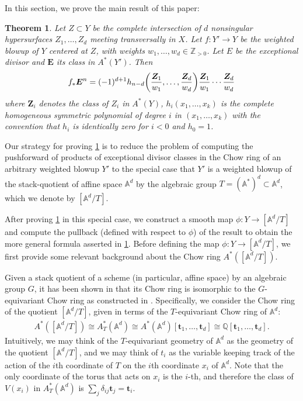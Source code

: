 \documentclass[11pt,oneside,english]{article}
\numberwithin{equation}{section}
\let\originalleft\left
\let\originalright\right
\renewcommand*{\left}{\mathopen{}\mathclose\bgroup\originalleft}
\renewcommand*{\right}{\aftergroup\egroup\originalright}
\newtheorem{theorem}{Theorem}[section]
\theoremstyle{definition}
\newcommand{\ra}{\rightarrow}
\newcommand\A{\mathbb{A}}
\begin{document}
In this section, we prove the main result of this paper:




\begin{theorem} \label{main}{Let $Z \subset Y$ be the complete intersection of $d$ nonsingular hypersurfaces $Z_1, \dots , Z_d$ meeting transversally in $X$. Let $f :  Y' \rightarrow Y$ be the weighted blowup of $Y$ centered at $Z$, with weights $w_1, \dots, w_d \in \mathbb Z_{> 0}$. Let $E$ be the exceptional divisor and $\boldsymbol {E}$ its class in $A^*(Y')$. Then}
	\begin{align}
	\label{eqn:main}
		f_* \boldsymbol E^n = (-1)^{d+1} h_{n-d} \left( \frac{\boldsymbol Z_1}{w_1}, \dots, \frac{\boldsymbol Z_d}{w_d}\right)  \frac{\boldsymbol Z_1}{w_1} \cdots \frac{\boldsymbol Z_d}{w_d}
	\end{align}
{where $\boldsymbol Z_i $ denotes the class of $Z_i$ in $A^*(Y)$, $h_i(x_1,\dots,x_k)$ is the complete homogeneous symmetric polynomial of degree $i$ in $(x_1, \dots, x_k)$ with the convention that $h_i$ is identically zero for $i<0$ and $h_0 =1$.}
\end{theorem}


Our strategy for proving \cref{main} is to reduce the problem of computing the pushforward of products of exceptional divisor classes in the Chow ring of an arbitrary weighted blowup $Y'$ to the special case that $Y'$ is a weighted blowup of the stack-quotient of affine space $\mathbb A^d$ by the algebraic group 
$T = (\mathbb A^*)^d \subset \mathbb A^d$, which we denote by $[\A^d/T]$. 


After proving \cref{main} in this special case, we construct a smooth map $\phi:Y \ra [\A^d/T]$ and compute the pullback (defined with respect to $\phi$) of the result to obtain the more general formula asserted in \cref{main}. Before defining the map $\phi : Y \ra [\A^d /T]$, we first provide some relevant background about the Chow ring $A^*([\A^d/T])$. 

Given a stack quotient of a scheme (in particular, affine space) by an algebraic group $G$, it has been shown in \cite[Theorem 4]{EG} that its Chow ring is isomorphic to the $G$-equivariant Chow ring as constructed in \cite[Definition 1]{EG}. Specifically, we consider the Chow ring of the quotient $[\A^d/T]$, given in terms of the $T$-equivariant Chow ring of $\A^d$:
    \begin{align*}
A^*([\mathbb A^d /  T ]) \cong A_T^*(\mathbb A^d) \cong A^*(\A^d)[\boldsymbol{t}_1,\dots, \boldsymbol{t}_d] \cong \mathbb Q [\boldsymbol{t}_1,\dots, \boldsymbol{t}_d].
    \end{align*}
 Intuitively, we may think of the $T$-equivariant geometry of $\A^d$ as the geometry of the quotient $[\A^d/T]$, and we may think of $ t_i$ as the variable keeping track of the action of the $i$th coordinate of $T$ on the $i$th coordinate $x_i$ of $\A^d$. Note that the only coordinate of the torus that acts on $x_i$ is the $i$-th, and therefore the class of $V(x_i)$ in $A^*_T(\A^d)$ is $\sum_j \delta_{ij} \boldsymbol t_j=\boldsymbol t_i$.
\end{document}
